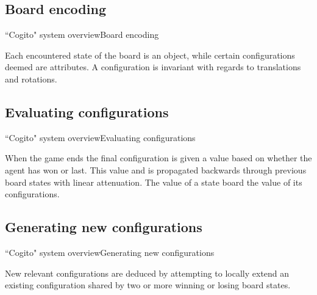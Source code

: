 \subsection{Board encoding}
\begin{frame}{``Cogito" system overview}{Board encoding}

Each encountered state of the board is an object, while certain configurations 
deemed are attributes. A configuration is invariant with regards to translations 
and rotations.

\end{frame}

\subsection{Evaluating configurations}
\begin{frame}{``Cogito" system overview}{Evaluating configurations}

When the game ends the final configuration is given a value based on whether the 
agent has won or last. This value and is propagated backwards through previous
board states with linear attenuation. The value of a state board the value 
of its configurations.

\end{frame}

\subsection{Generating new configurations}
\begin{frame}{``Cogito" system overview}{Generating new configurations}

New relevant configurations are deduced by attempting to locally extend an 
existing configuration shared by two or more winning or losing board states.

\end{frame}

